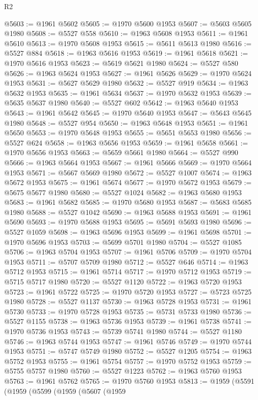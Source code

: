 \begin{lexlean}{R2}
\begin{coremodule}
@5603 := @1961 @5602
@5605 := @1970 @5600 @1953
@5607 := @5603 @5605 @1980
@5608 := @5527 @558
@5610 := @1963 @5608 @1953
@5611 := @1961 @5610
@5613 := @1970 @5608 @1953
@5615 := @5611 @5613 @1980
@5616 := @5527 @884
@5618 := @1963 @5616 @1953
@5619 := @1961 @5618
@5621 := @1970 @5616 @1953
@5623 := @5619 @5621 @1980
@5624 := @5527 @580
@5626 := @1963 @5624 @1953
@5627 := @1961 @5626
@5629 := @1970 @5624 @1953
@5631 := @5627 @5629 @1980
@5632 := @5527 @919
@5634 := @1963 @5632 @1953
@5635 := @1961 @5634
@5637 := @1970 @5632 @1953
@5639 := @5635 @5637 @1980
@5640 := @5527 @602
@5642 := @1963 @5640 @1953
@5643 := @1961 @5642
@5645 := @1970 @5640 @1953
@5647 := @5643 @5645 @1980
@5648 := @5527 @954
@5650 := @1963 @5648 @1953
@5651 := @1961 @5650
@5653 := @1970 @5648 @1953
@5655 := @5651 @5653 @1980
@5656 := @5527 @624
@5658 := @1963 @5656 @1953
@5659 := @1961 @5658
@5661 := @1970 @5656 @1953
@5663 := @5659 @5661 @1980
@5664 := @5527 @990
@5666 := @1963 @5664 @1953
@5667 := @1961 @5666
@5669 := @1970 @5664 @1953
@5671 := @5667 @5669 @1980
@5672 := @5527 @1007
@5674 := @1963 @5672 @1953
@5675 := @1961 @5674
@5677 := @1970 @5672 @1953
@5679 := @5675 @5677 @1980
@5680 := @5527 @1024
@5682 := @1963 @5680 @1953
@5683 := @1961 @5682
@5685 := @1970 @5680 @1953
@5687 := @5683 @5685 @1980
@5688 := @5527 @1042
@5690 := @1963 @5688 @1953
@5691 := @1961 @5690
@5693 := @1970 @5688 @1953
@5695 := @5691 @5693 @1980
@5696 := @5527 @1059
@5698 := @1963 @5696 @1953
@5699 := @1961 @5698
@5701 := @1970 @5696 @1953
@5703 := @5699 @5701 @1980
@5704 := @5527 @1085
@5706 := @1963 @5704 @1953
@5707 := @1961 @5706
@5709 := @1970 @5704 @1953
@5711 := @5707 @5709 @1980
@5712 := @5527 @646
@5714 := @1963 @5712 @1953
@5715 := @1961 @5714
@5717 := @1970 @5712 @1953
@5719 := @5715 @5717 @1980
@5720 := @5527 @1120
@5722 := @1963 @5720 @1953
@5723 := @1961 @5722
@5725 := @1970 @5720 @1953
@5727 := @5723 @5725 @1980
@5728 := @5527 @1137
@5730 := @1963 @5728 @1953
@5731 := @1961 @5730
@5733 := @1970 @5728 @1953
@5735 := @5731 @5733 @1980
@5736 := @5527 @1155
@5738 := @1963 @5736 @1953
@5739 := @1961 @5738
@5741 := @1970 @5736 @1953
@5743 := @5739 @5741 @1980
@5744 := @5527 @1180
@5746 := @1963 @5744 @1953
@5747 := @1961 @5746
@5749 := @1970 @5744 @1953
@5751 := @5747 @5749 @1980
@5752 := @5527 @1205
@5754 := @1963 @5752 @1953
@5755 := @1961 @5754
@5757 := @1970 @5752 @1953
@5759 := @5755 @5757 @1980
@5760 := @5527 @1223
@5762 := @1963 @5760 @1953
@5763 := @1961 @5762
@5765 := @1970 @5760 @1953
@5813 := @1959
    (@5591
      (@1959
        (@5599
          (@1959
            (@5607
              (@1959

\end{coremodule}
\end{lexlean}
